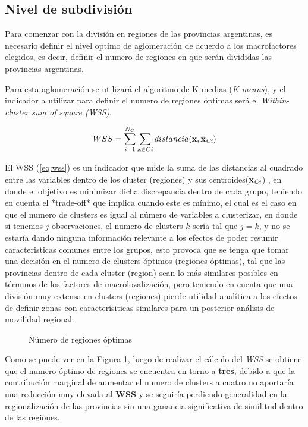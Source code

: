 \documentclass[12pt,a4paper]{article}
\begin{document}
\subsection{Nivel de subdivisión}

Para comenzar con la división en regiones de las provincias argentinas, es necesario definir el nivel optimo de aglomeración de acuerdo a los macrofactores elegidos, es decir, definir el numero de regiones en que serán divididas las provincias argentinas.

Para esta aglomeración se utilizará el algoritmo de K-medias (\textit{K-means}), y el indicador a utilizar para definir el numero de regiones óptimas será el \textit{Within-cluster sum of square (WSS)}.

\vspace{5mm}
\begin {center}
\begin{equation}\label{eq:wss}
WSS=\sum_{i=1}^{N_{C}} \sum_{\textbf{x}\in Ci} distancia(\textbf{x},\bar{\textbf{x}}_{\tiny{\textit{Ci}}})
\end{equation}
\end {center}
\vspace{5mm}


El WSS (\ref{eq:wss}) es un indicador que mide la suma de las distancias al cuadrado entre las variables dentro de  los cluster (regiones) y sus centroides($\bar{\textbf{x}}_{\tiny{\textit{Ci}}}$) , en donde el objetivo es minimizar dicha discrepancia dentro de cada grupo, teniendo en cuenta el *trade-off* que implica cuando este es mínimo, el cual es el caso en que el numero de clusters es igual al número de variables a clusterizar, en donde si tenemos $j$ observaciones, el numero de clusters $k$ sería tal que $j=k$, y no se estaría dando ninguna información relevante a los efectos de poder resumir caracteristicas comunes entre los grupos, esto provoca que se tenga que tomar una decisión en el numero de clusters óptimos (regiones óptimas), tal que las provincias dentro de cada cluster (region) sean lo más similares posibles en términos de los factores de macrolozalización, pero teniendo en cuenta que una división muy extensa en clusters (regiones) pierde utilidad analítica a los efectos de definir zonas con caracterísiticas similares para un posterior análisis de movilidad regional.

\begin{figure}[h!]
\begin{center}
 	
	\caption{Número de regiones óptimas}
	\label{figure:optimas}
\end{center}
\end{figure}
\newpage
Como se puede ver en la Figura \ref{figure:optimas}, luego de realizar el cálculo del \textit{WSS} se obtiene que el numero óptimo de regiones se encuentra en torno a \textbf{tres}, debido a que la contribución marginal de aumentar el numero de  clusters a cuatro no aportaría una reducción muy elevada al \textbf{WSS} y se seguiría perdiendo generalidad en la regionalización de las provincias sin una ganancia significativa de similitud dentro de las regiones.
\end{document}
